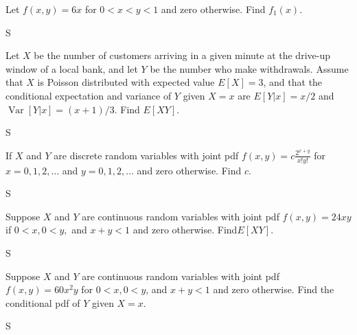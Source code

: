 \documentclass[answers]{exam}
\begin{document}
\begin{questions}
\question 
Let \(f(x,y) = 6x\) for \(0<x<y<1\) and zero otherwise. Find \(f_1(x)\).
\begin{solution}
	S
\end{solution}

\question 
Let $X$ be the number of customers arriving in a given minute at the drive-up window of a local bank, and let $Y$ be the number who make withdrawals. Assume that $X$ is Poisson distributed with expected value \(E[X]=3\), and that the conditional expectation and variance of $Y$ given \(X=x\) are \(E[Y|x] = x/2\) and \(\operatorname{Var}[Y|x]=(x+1)/3\). Find \(E[XY]\).
\begin{solution}
	S
\end{solution}

\question 
If $X$ and $Y$ are discrete random variables with joint pdf \(f(x,y) = c\frac{2^{x+y}}{x!y!}\) 
for \(x=0,1,2,\ldots\) and \(y=0,1,2,\ldots\) and zero otherwise. Find $c$.
\begin{solution}
	S
\end{solution}

\question 
Suppose $X$ and $Y$ are continuous random variables with joint pdf
\(f(x,y)= 24xy\) if \(0<x,0<y,\) and \(x+y<1\) and zero otherwise. Find\(E[XY]\).
\begin{solution}
	S
\end{solution}

\question 
Suppose $X$ and $Y$ are continuous random variables with joint pdf
\(f(x,y) = 60x^2y\) for \(0<x,0<y\), and \(x+y<1\) and zero otherwise. Find the
conditional pdf of $Y$ given \(X=x\).
\begin{solution}
	S
\end{solution}

\end{questions}
\end{document}

